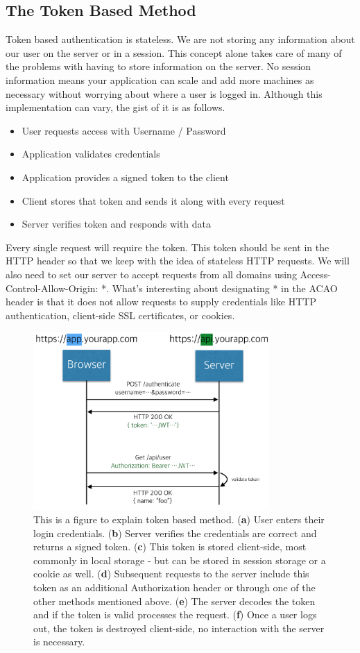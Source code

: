 \documentclass[journal,article,submit,moreauthors,pdftex,10pt,a4paper]{mdpi}
\begin{document}
\subsection{The Token Based Method}
Token based authentication is stateless. We are not storing any information about our user on the server or in a session. This concept alone takes care of many of the problems with having to store information on the server\cite{one-time-cookies}.
No session information means your application can scale and add more machines as necessary without worrying about where a user is logged in.
Although this implementation can vary, the gist of it is as follows.
\begin{itemize}[leftmargin=*,labelsep=4mm]
\item User requests access with Username / Password
\item Application validates credentials
\item Application provides a signed token to the client
\item Client stores that token and sends it along with every request
\item Server verifies token and responds with data
\end{itemize}

Every single request will require the token. This token should be sent in the HTTP header so that we keep with the idea of stateless HTTP requests. We will also need to set our server to accept requests from all domains using Access-Control-Allow-Origin: *. What’s interesting about designating * in the ACAO header is that it does not allow requests to supply credentials like HTTP authentication, client-side SSL certificates, or cookies.

\begin{figure}[H]
\centering
\includegraphics[width=9cm]{figures/tokenbased}
\caption{This is a figure to explain token based method. (\textbf{a}) User enters their login credentials. (\textbf{b}) Server verifies the credentials are correct and returns a signed token. (\textbf{c}) This token is stored client-side, most commonly in local storage - but can be stored in session storage or a cookie as well. (\textbf{d}) Subsequent requests to the server include this token as an additional Authorization header or through one of the other methods mentioned above. (\textbf{e}) The server decodes the token and if the token is valid processes the request. (\textbf{f}) Once a user logs out, the token is destroyed client-side, no interaction with the server is necessary.}
\label{tokenbased}
\end{figure}
\end{document}
